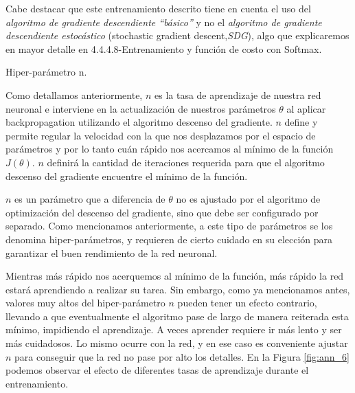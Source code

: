 \documentclass[12pt,a4paper]{article}
\makeatletter
\renewcommand\paragraph{\@startsection{paragraph}{4}{\z@}
            {-2.5ex\@plus -1ex \@minus -.25ex}
            {1.25ex \@plus .25ex}
            {\normalfont\normalsize\bfseries}}
\makeatother
\begin{document}
\begin{sloppypar}
\begin{enumerate}
\end{enumerate}

Cabe destacar que este entrenamiento descrito tiene en cuenta el uso del \textit{algoritmo de gradiente descendiente “básico”} y no el \textit{algoritmo de gradiente descendiente estocástico} (stochastic gradient descent,\textit{SDG}), algo que explicaremos en mayor detalle en 4.4.4.8-Entrenamiento y función de costo con Softmax.

\paragraph{Hiper-parámetro n.}\label{hiper_n}

Como detallamos anteriormente, $n$ es la tasa de aprendizaje de nuestra red neuronal e interviene en la actualización de nuestros parámetros  $\theta$ al aplicar backpropagation utilizando el algoritmo descenso del gradiente. $n$ define y permite regular la velocidad con la que nos desplazamos por el espacio de parámetros y por lo tanto cuán rápido nos acercamos al mínimo de la función $J(\theta)$. $n$ definirá la cantidad de iteraciones requerida para que el algoritmo descenso del gradiente encuentre el mínimo de la función.

$n$ es un parámetro que a diferencia de $\theta$ no es ajustado por el algoritmo de optimización del descenso del gradiente, sino que debe ser configurado por separado. Como mencionamos anteriormente, a este tipo de parámetros se los denomina hiper-parámetros, y requieren de cierto cuidado en su elección para garantizar el buen rendimiento de la red neuronal. 

Mientras más rápido nos acerquemos al mínimo de la función, más rápido la red estará aprendiendo a realizar su tarea. Sin embargo, como ya mencionamos antes, valores muy altos del hiper-parámetro $n$ pueden tener un efecto contrario, llevando a que eventualmente el algoritmo pase de largo de manera reiterada esta mínimo, impidiendo el aprendizaje. A veces aprender requiere ir más lento y ser más cuidadosos. Lo mismo ocurre con la red, y en ese caso es conveniente ajustar $n$ para conseguir que la red no pase por alto los detalles. En la Figura \ref{fig:ann_6} podemos observar el efecto de diferentes tasas de aprendizaje durante el entrenamiento. 


\end{sloppypar}
\end{document}
